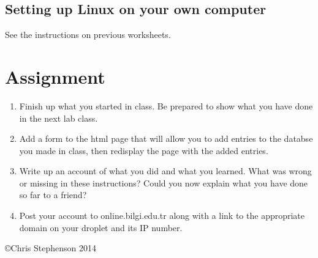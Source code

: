 \documentclass[12pt, a4paper]{article}
\begin{document}
\subsection*{Setting up Linux on your own computer}

See the instructions on previous worksheets.


\section*{Assignment}

\begin{enumerate}
\item Finish up what you started in class. Be prepared to show what you have done in the next lab class.
\item Add a form to the html page that will allow you to add entries to the databse you made in class, then redisplay the page with the added entries.
\item Write up an account of what you did and what you learned. What was wrong or missing in these instructions? Could you now explain what you have done so far to a friend?
\item Post your account to online.bilgi.edu.tr along with a link to the appropriate domain on your droplet and its IP number.

\end{enumerate}

\copyright Chris Stephenson 2014
\end{document}
